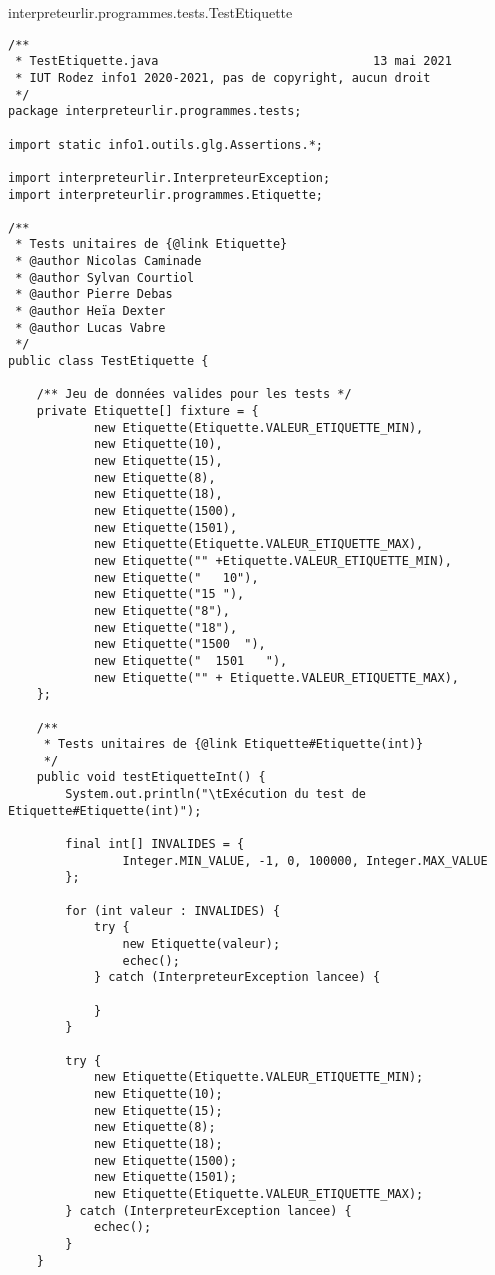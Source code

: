 \begin{enum}
    \item interpreteurlir.programmes.tests.TestEtiquette
\begin{verbatim}
/**
 * TestEtiquette.java                              13 mai 2021
 * IUT Rodez info1 2020-2021, pas de copyright, aucun droit
 */
package interpreteurlir.programmes.tests;

import static info1.outils.glg.Assertions.*;

import interpreteurlir.InterpreteurException;
import interpreteurlir.programmes.Etiquette;

/**
 * Tests unitaires de {@link Etiquette}
 * @author Nicolas Caminade
 * @author Sylvan Courtiol
 * @author Pierre Debas
 * @author Heïa Dexter
 * @author Lucas Vabre
 */
public class TestEtiquette {

    /** Jeu de données valides pour les tests */
    private Etiquette[] fixture = {
            new Etiquette(Etiquette.VALEUR_ETIQUETTE_MIN),
            new Etiquette(10),
            new Etiquette(15),
            new Etiquette(8),
            new Etiquette(18),
            new Etiquette(1500),
            new Etiquette(1501),
            new Etiquette(Etiquette.VALEUR_ETIQUETTE_MAX),
            new Etiquette("" +Etiquette.VALEUR_ETIQUETTE_MIN),
            new Etiquette("   10"),
            new Etiquette("15 "),
            new Etiquette("8"),
            new Etiquette("18"),
            new Etiquette("1500  "),
            new Etiquette("  1501   "),
            new Etiquette("" + Etiquette.VALEUR_ETIQUETTE_MAX),
    };
    
    /**
     * Tests unitaires de {@link Etiquette#Etiquette(int)}
     */
    public void testEtiquetteInt() {
        System.out.println("\tExécution du test de Etiquette#Etiquette(int)");
        
        final int[] INVALIDES = {
                Integer.MIN_VALUE, -1, 0, 100000, Integer.MAX_VALUE
        };
        
        for (int valeur : INVALIDES) {
            try {
                new Etiquette(valeur);
                echec();
            } catch (InterpreteurException lancee) {
                
            }
        }
        
        try {
            new Etiquette(Etiquette.VALEUR_ETIQUETTE_MIN);
            new Etiquette(10);
            new Etiquette(15);
            new Etiquette(8);
            new Etiquette(18);
            new Etiquette(1500);
            new Etiquette(1501);
            new Etiquette(Etiquette.VALEUR_ETIQUETTE_MAX);
        } catch (InterpreteurException lancee) {
            echec();
        }
    }
    

\end{verbatim}
\end{enum}
